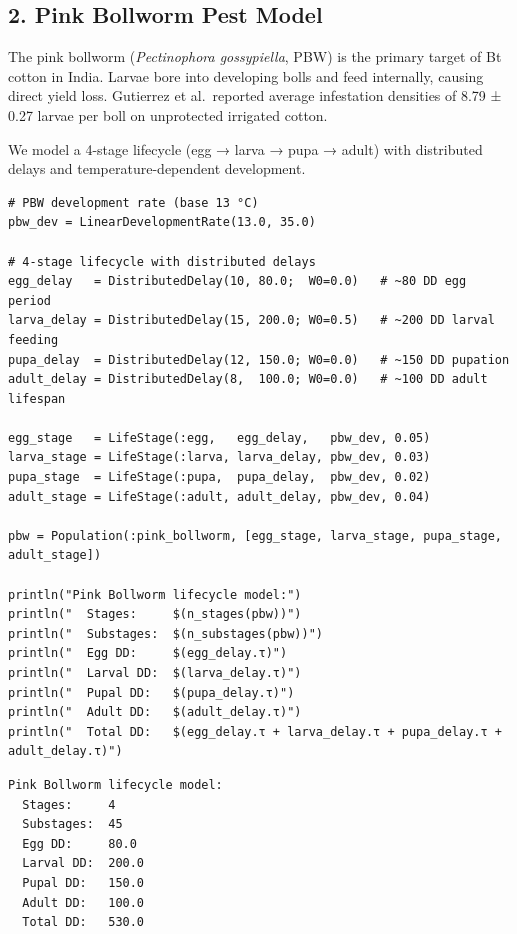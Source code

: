 \subsection{2. Pink Bollworm Pest Model}



\label{6177830666302211485}{}


The pink bollworm (\emph{Pectinophora gossypiella}, PBW) is the primary target of Bt cotton in India. Larvae bore into developing bolls and feed internally, causing direct yield loss. Gutierrez et al.~reported average infestation densities of 8.79 ± 0.27 larvae per boll on unprotected irrigated cotton.



We model a 4-stage lifecycle (egg → larva → pupa → adult) with distributed delays and temperature-dependent development.




\begin{verbatim}
# PBW development rate (base 13 °C)
pbw_dev = LinearDevelopmentRate(13.0, 35.0)

# 4-stage lifecycle with distributed delays
egg_delay   = DistributedDelay(10, 80.0;  W0=0.0)   # ~80 DD egg period
larva_delay = DistributedDelay(15, 200.0; W0=0.5)   # ~200 DD larval feeding
pupa_delay  = DistributedDelay(12, 150.0; W0=0.0)   # ~150 DD pupation
adult_delay = DistributedDelay(8,  100.0; W0=0.0)   # ~100 DD adult lifespan

egg_stage   = LifeStage(:egg,   egg_delay,   pbw_dev, 0.05)
larva_stage = LifeStage(:larva, larva_delay, pbw_dev, 0.03)
pupa_stage  = LifeStage(:pupa,  pupa_delay,  pbw_dev, 0.02)
adult_stage = LifeStage(:adult, adult_delay, pbw_dev, 0.04)

pbw = Population(:pink_bollworm, [egg_stage, larva_stage, pupa_stage, adult_stage])

println("Pink Bollworm lifecycle model:")
println("  Stages:     $(n_stages(pbw))")
println("  Substages:  $(n_substages(pbw))")
println("  Egg DD:     $(egg_delay.τ)")
println("  Larval DD:  $(larva_delay.τ)")
println("  Pupal DD:   $(pupa_delay.τ)")
println("  Adult DD:   $(adult_delay.τ)")
println("  Total DD:   $(egg_delay.τ + larva_delay.τ + pupa_delay.τ + adult_delay.τ)")
\end{verbatim}




\begin{verbatim}
Pink Bollworm lifecycle model:
  Stages:     4
  Substages:  45
  Egg DD:     80.0
  Larval DD:  200.0
  Pupal DD:   150.0
  Adult DD:   100.0
  Total DD:   530.0
\end{verbatim}



